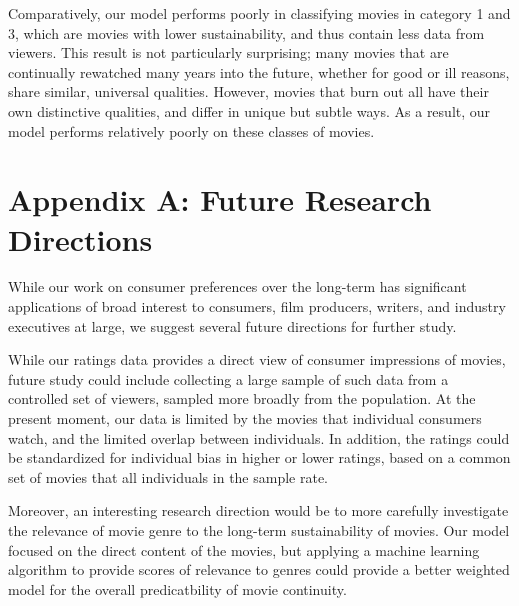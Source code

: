 \documentclass[12pt]{article}
\begin{document}
Comparatively, our model performs poorly in classifying movies in category 1 and 3, which are movies with lower sustainability, and thus contain less data from viewers. This result is not particularly surprising; many movies that are continually rewatched many years into the future, whether for good or ill reasons, share similar, universal qualities. However, movies that burn out all have their own distinctive qualities, and differ in unique but subtle ways. As a result, our model performs relatively poorly on these classes of movies.



\section{Appendix A: Future Research Directions}
While our work on consumer preferences over the long-term has significant applications of broad interest to consumers, film producers, writers, and industry executives at large, we suggest several future directions for further study.

While our ratings data provides a direct view of consumer impressions of movies, future study could include collecting a large sample of such data from a controlled set of viewers, sampled more broadly from the population. At the present moment, our data is limited by the movies that individual consumers watch, and the limited overlap between individuals. In addition, the ratings could be standardized for individual bias in higher or lower ratings, based on a common set of movies that all individuals in the sample rate. 

Moreover, an interesting research direction would be to more carefully investigate the relevance of movie genre to the long-term sustainability of movies. Our model focused on the direct content of the movies, but applying a machine learning algorithm to provide scores of relevance to genres could provide a better weighted model for the overall predicatbility of movie continuity.
\end{document}
